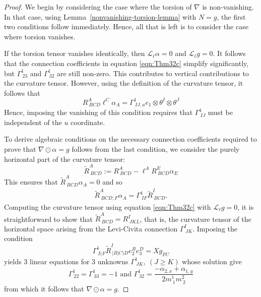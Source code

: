 \documentclass{article}
\newcommand{\ai}{A}
\newcommand{\bb}{B}
\newcommand{\cc}{C}
\newcommand{\dd}{D}
\newcommand{\eee}{E}
\newcommand{\ff}{F}
\newcommand{\ii}{I}
\newcommand{\jj}{J}
\newcommand{\kk}{K}
\newcommand{\li}{L}
\theoremstyle{definition}
\theoremstyle{remark}
\begin{document}
\begin{proof}


We begin by considering the case where the torsion of $\nabla$ is non-vanishing. In that case, using Lemma~\ref{nonvanishing-torsion-lemma} with $N = g$, the first two conditions follow immediately. Hence, all that is left is to consider the case where torsion vanishes. 


    If the torsion tensor vanishes identically, then $\mathcal{L}_\ell \alpha = 0$ and $\mathcal{L}_\ell g = 0$. It follows that the connection coefficients in equation \eqref{eqn:Thm32c} simplify significantly, but $\Gamma^1_{~23}$ and $\Gamma^1_{~32}$ are still non-zero. This contributes to vertical contributions to the curvature tensor. However, using the definition of the curvature tensor, it follows that
    \begin{equation}
        R^\ai_{~\bb\cc\dd} \ell^\cc \alpha_\ai = \Gamma^1_{~\ii\jj,u} e_1 \otimes \theta^\ii \otimes \theta^\jj  
    \end{equation}
    \noindent Hence, imposing the vanishing of this condition requires that $\Gamma^1_ {~\ii\jj}$ must be independent of the $u$ coordinate.
    
    To derive algebraic conditions on the necessary connection coefficients required to prove that $ \nabla \odot\alpha = g$ follows from the last condition, we consider the purely horizontal part of the curvature tensor: 
    \begin{equation}
        \tilde{R}^\ai_{~\bb\cc\dd} := R^\ai_{~\bb\cc\dd} - \ell^\ai R^\eee_{~\bb\cc\dd} \alpha_\eee  
    \end{equation}
    This ensures that $\tilde{R}^\ai_{~\bb\cc\dd} \alpha_\ai = 0$ and so
    \begin{equation}
    \begin{aligned}
        \tilde{R}^\ai_{~\bb\cc\dd;\ff}\alpha_\ai =  \Gamma^1_{~\ii\ff} \tilde{R}^\ii_{~\bb\cc\dd}. \label{eqn:PotentialCurvatureDerivative} 
    \end{aligned}
    \end{equation}
    Computing the curvature tensor using equation \eqref{eqn:Thm32c} with $\mathcal{L}_\ell g = 0$, it is straightforward to show that $\tilde{R}^\ai_{~\bb\cc\dd} = R^\ii_{~\jj\kk\li}$, that is, the curvature tensor of the horizontal space arising from the Levi-Civita connection $\Gamma^\ii_{~\jj\kk}$. Imposing the condition $$ \Gamma^1_{~I(\ff}\tilde{R}^\ii_{~|\bb|\cc)\dd}e_2^\bb e_3^\dd = X g_{\ff\cc} $$ yields 3 linear equations for 3 unknowns $\Gamma^1_{~\jj\kk},~ (\jj \geq \kk)$ whose solution give $$\Gamma^1_{~22} = \Gamma^1_{~33} = -1 \text{ and } \Gamma^1_{~32} = \frac{- \alpha_{2,x}+\alpha_{1,y}}{2 m^1_{~1} m^2_{~2}}$$ from which it follows that $ \nabla \odot\alpha = g$. 


\end{proof}
\end{document}
